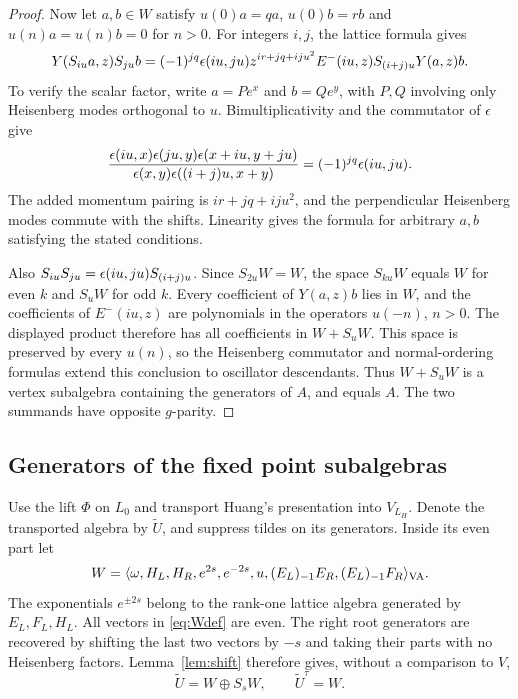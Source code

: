 \documentclass[11pt,reqno]{amsart}
\theoremstyle{definition}\newtheorem{definition}[theorem]{Definition}
\theoremstyle{remark}\newtheorem{remark}[theorem]{Remark}
\numberwithin{equation}{section}
\begin{document}
\begin{proof}
Now let $a,b\in W$ satisfy $u(0)a=qa$, $u(0)b=rb$ and $u(n)a=u(n)b=0$ for $n>0$. For integers $i,j$, the lattice formula gives
\[
 Y(S_{iu}a,z)S_{ju}b
 =(-1)^{jq}\epsilon(iu,ju)z^{ir+jq+ij u^2}
   E^-(iu,z)S_{(i+j)u}Y(a,z)b.
\]
To verify the scalar factor, write $a=Pe^x$ and $b=Qe^y$, with $P,Q$ involving only Heisenberg modes orthogonal to $u$. Bimultiplicativity and the commutator of $\epsilon$ give
\[
 \frac{\epsilon(iu,x)\epsilon(ju,y)\epsilon(x+iu,y+ju)}
      {\epsilon(x,y)\epsilon((i+j)u,x+y)}
 =(-1)^{jq}\epsilon(iu,ju).
\]
The added momentum pairing is $ir+jq+ij u^2$, and the perpendicular Heisenberg modes commute with the shifts. Linearity gives the formula for arbitrary $a,b$ satisfying the stated conditions.

Also $S_{iu}S_{ju}=\epsilon(iu,ju)S_{(i+j)u}$. Since $S_{2u}W=W$, the space $S_{ku}W$ equals $W$ for even $k$ and $S_uW$ for odd $k$. Every coefficient of $Y(a,z)b$ lies in $W$, and the coefficients of $E^-(iu,z)$ are polynomials in the operators $u(-n)$, $n>0$. The displayed product therefore has all coefficients in $W+S_uW$. This space is preserved by every $u(n)$, so the Heisenberg commutator and normal-ordering formulas extend this conclusion to oscillator descendants. Thus $W+S_uW$ is a vertex subalgebra containing the generators of $A$, and equals $A$. The two summands have opposite $g$-parity.
\end{proof}

\subsection{Generators of the fixed point subalgebras}
Use the lift $\Phi$ on $L_0$ and transport Huang's presentation into $V_{L_H}$. Denote the transported algebra by $\widetilde U$, and suppress tildes on its generators. Inside its even part let
\begin{equation}\label{eq:Wdef}
 W=\langle\omega,H_L,H_R,e^{2s},e^{-2s},u,
                 (E_L)_{-1}E_R,(E_L)_{-1}F_R\rangle_{\rm VA}.
\end{equation}
The exponentials $e^{\pm2s}$ belong to the rank-one lattice algebra generated by $E_L,F_L,H_L$. All vectors in \eqref{eq:Wdef} are even. The right root generators are recovered by shifting the last two vectors by $-s$ and taking their parts with no Heisenberg factors. Lemma~\ref{lem:shift} therefore gives, without a comparison to $V$,
\begin{equation}\label{eq:Ueven}
 \widetilde U=W\oplus S_sW,\qquad\widetilde U^\tau=W.
\end{equation}
\end{document}
